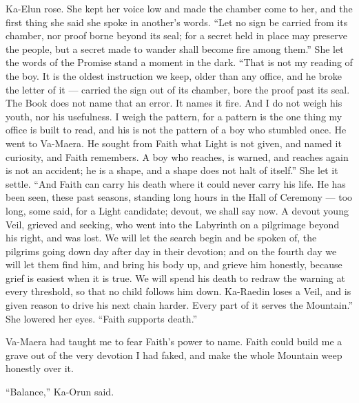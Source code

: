 Ka-Elun rose. She kept her voice low and made the chamber come to her, and the first thing she said she spoke in another's words. ``Let no sign be carried from its chamber, nor proof borne beyond its seal; for a secret held in place may preserve the people, but a secret made to wander shall become fire among them.'' She let the words of the Promise stand a moment in the dark. ``That is not my reading of the boy. It is the oldest instruction we keep, older than any office, and he broke the letter of it --- carried the sign out of its chamber, bore the proof past its seal. The Book does not name that an error. It names it fire. And I do not weigh his youth, nor his usefulness. I weigh the pattern, for a pattern is the one thing my office is built to read, and his is not the pattern of a boy who stumbled once. He went to Va-Maera. He sought from Faith what Light is not given, and named it curiosity, and Faith remembers. A boy who reaches, is warned, and reaches again is not an accident; he is a shape, and a shape does not halt of itself.'' She let it settle. ``And Faith can carry his death where it could never carry his life. He has been seen, these past seasons, standing long hours in the Hall of Ceremony --- too long, some said, for a Light candidate; devout, we shall say now. A devout young Veil, grieved and seeking, who went into the Labyrinth on a pilgrimage beyond his right, and was lost. We will let the search begin and be spoken of, the pilgrims going down day after day in their devotion; and on the fourth day we will let them find him, and bring his body up, and grieve him honestly, because grief is easiest when it is true. We will spend his death to redraw the warning at every threshold, so that no child follows him down. Ka-Raedin loses a Veil, and is given reason to drive his next chain harder. Every part of it serves the Mountain.'' She lowered her eyes. ``Faith supports death.''\par

Va-Maera had taught me to fear Faith's power to name. Faith could build me a grave out of the very devotion I had faked, and make the whole Mountain weep honestly over it.\par

``Balance,'' Ka-Orun said.\par

